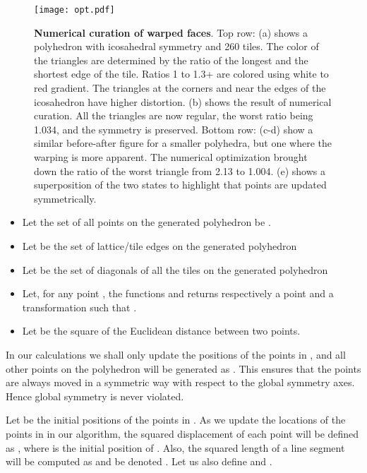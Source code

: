 \documentclass[11pt]{article}
\newcommand{\1}{\mathds{1}}
\begin{document}
\begin{figure}
\centering
\vspace{-0.5cm}
\texttt{[image: opt.pdf]}
\vspace{-0.5cm}
\caption[Numerical curation of warped faces]{ \textbf{Numerical curation of warped faces}. Top row: (a) shows a polyhedron with icosahedral symmetry and 260 tiles. The color of the triangles are determined by the ratio of the longest and the shortest edge of the tile. Ratios 1 to 1.3+ are colored using white to red gradient. The triangles at the corners and near the edges of the icosahedron have higher distortion. (b) shows the result of numerical curation. All the triangles are now regular, the worst ratio being 1.034, and the symmetry is preserved. Bottom row: (c-d) show a similar before-after figure for a smaller polyhedra, but one where the warping is more apparent. The numerical optimization brought down the ratio of the worst triangle from 2.13 to 1.004. (e) shows a superposition of the two states to highlight that points are updated symmetrically.}
\label{fig:assemblytheory:demo3}
\vspace{-0.5cm}
\end{figure}

\begin{itemize}
 \item Let the set of all points on the generated polyhedron be .
 \item Let  be the set of lattice/tile edges on the generated polyhedron
 \item Let  be the set of diagonals of all the tiles on the generated polyhedron
 \item Let, for any point , the functions  and  returns respectively a point  and a transformation  such that .
 \item Let  be the square of the Euclidean distance between two points.
\end{itemize}

In our calculations we shall only update the positions of the points in , and all other points  on the polyhedron will be generated as . This ensures that the points are always moved in a symmetric way with respect to the global symmetry axes. Hence global symmetry is never violated.

Let  be the initial positions of the points in . As we update the locations of the points in  in our algorithm, the squared displacement of each point  will be defined as , where  is the initial position of . Also, the squared length of a line segment  will be computed as  and be denoted . Let us also define  and . 
\end{document}
